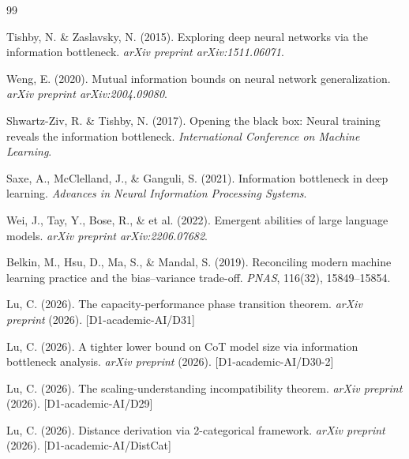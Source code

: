 \documentclass[12pt]{article}
\theoremstyle{definition}
\theoremstyle{remark}
\begin{document}

\begin{thebibliography}{99}

Tishby, N. \& Zaslavsky, N. (2015).
Exploring deep neural networks via the information bottleneck.
\textit{arXiv preprint arXiv:1511.06071}.

Weng, E. (2020).
Mutual information bounds on neural network generalization.
\textit{arXiv preprint arXiv:2004.09080}.

Shwartz-Ziv, R. \& Tishby, N. (2017).
Opening the black box: Neural training reveals the information bottleneck.
\textit{International Conference on Machine Learning}.

Saxe, A., McClelland, J., \& Ganguli, S. (2021).
Information bottleneck in deep learning.
\textit{Advances in Neural Information Processing Systems}.

Wei, J., Tay, Y., Bose, R., \& et al. (2022).
Emergent abilities of large language models.
\textit{arXiv preprint arXiv:2206.07682}.

Belkin, M., Hsu, D., Ma, S., \& Mandal, S. (2019).
Reconciling modern machine learning practice and the bias--variance trade-off.
\textit{PNAS}, 116(32), 15849--15854.

Lu, C. (2026).
The capacity-performance phase transition theorem.
\textit{arXiv preprint} (2026). [D1-academic-AI/D31]

Lu, C. (2026).
A tighter lower bound on CoT model size via information bottleneck analysis.
\textit{arXiv preprint} (2026). [D1-academic-AI/D30-2]

Lu, C. (2026).
The scaling-understanding incompatibility theorem.
\textit{arXiv preprint} (2026). [D1-academic-AI/D29]

Lu, C. (2026).
Distance derivation via 2-categorical framework.
\textit{arXiv preprint} (2026). [D1-academic-AI/DistCat]

\end{thebibliography}
\end{document}

